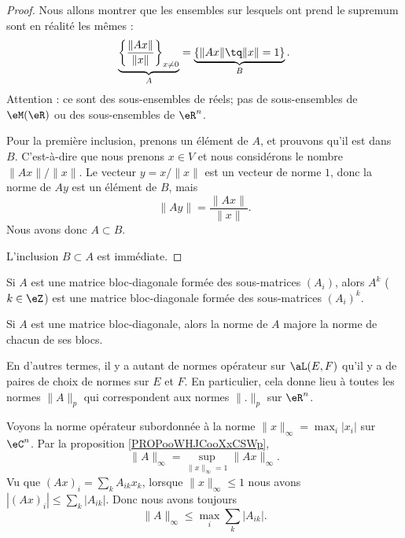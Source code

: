 \begin{proof}
	Nous allons montrer que les ensembles sur lesquels ont prend le supremum sont en réalité les mêmes :
	\begin{equation}
		\underbrace{\left\{ \frac{ \| Ax \| }{ \| x \| }\right\}_{x\neq 0}}_{A}=\underbrace{\left\{ \| Ax \|\tq \| x \|=1 \right\}}_{B}.
	\end{equation}
	Attention : ce sont des sous-ensembles de réels; pas de sous-ensembles de \( \eM(\eR)\) ou des sous-ensembles de \( \eR^n\).

	Pour la première inclusion, prenons un élément de \( A\), et prouvons qu'il est dans \( B\). C'est-à-dire que nous prenons \( x\in V\) et nous considérons le nombre \( \| Ax \|/\| x \|\). Le vecteur \( y=x/\| x \|\) est un vecteur de norme \( 1\), donc la norme de \( Ay\) est un élément de \( B\), mais
	\begin{equation}
		\| Ay \|=\frac{ \| Ax \| }{ \| x \| }.
	\end{equation}
	Nous avons donc \( A\subset B\).

	L'inclusion \( B\subset A\) est immédiate.
\end{proof}

\begin{lemma}       \label{LEMooHGCKooBzfAtg}
	Si \( A\) est une matrice bloc-diagonale formée des sous-matrices \( (A_i)\), alors \( A^k\) (\( k\in \eZ\)) est une matrice bloc-diagonale formée des sous-matrices \( (A_i)^k\).
\end{lemma}

\begin{proposition}      \label{PROPooJUYCooHnlFef}
	Si \( A\) est une matrice bloc-diagonale, alors la norme de \( A\) majore la norme de chacun de ses blocs.
\end{proposition}

En d'autres termes, il y a autant de normes opérateur sur \( \aL(E,F)\) qu'il y a de paires de choix de normes sur \( E\) et \( F\). En particulier, cela donne lieu à toutes les normes \( \| A \|_p\) qui correspondent aux normes \( \| . \|_p\) sur \( \eR^n\).

\begin{example}     \label{EXooXPXAooYyBwMX}
	Voyons la norme opérateur subordonnée à la norme \( \| x \|_{\infty}=\max_i| x_i |\) sur \( \eC^n\). Par la proposition \ref{PROPooWHJCooXxCSWp},
	\begin{equation}
		\| A \|_{\infty}=\sup_{\| x \|_{\infty}=1}\| Ax \|_{\infty}.
	\end{equation}
	Vu que \( (Ax)_i=\sum_kA_{ik}x_k\), lorsque \( \| x \|_{\infty}\leq 1\) nous avons \( | (Ax)_i |\leq \sum_k| A_{ik} |\). Donc nous avons toujours
	\begin{equation}        \label{EQooPLCIooVghasD}
		\| A \|_{\infty}\leq \max_i\sum_{k}| A_{ik} |.
	\end{equation}
\end{example}

